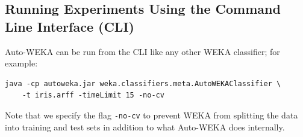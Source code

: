 \documentclass{article}
\begin{document}
\subsection{Running Experiments Using the Command Line Interface (CLI)}\label{sec:running}

Auto-WEKA can be run from the CLI like any other WEKA classifier; for example:
\begin{verbatim}
java -cp autoweka.jar weka.classifiers.meta.AutoWEKAClassifier \
    -t iris.arff -timeLimit 15 -no-cv
\end{verbatim}

Note that we specify the flag \verb=-no-cv= to prevent WEKA from splitting the
data into training and test sets in addition to what Auto-WEKA does internally.
\end{document}
